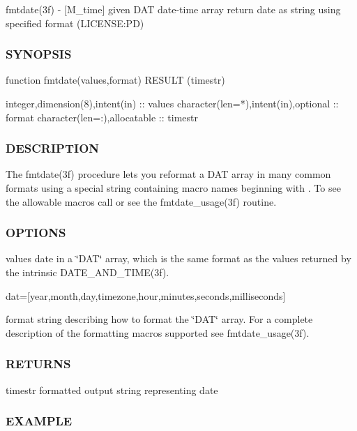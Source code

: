 fmtdate(3f) -\/ \mbox{[}M\+\_\+time\mbox{]} given D\+AT date-\/time array return date as string using specified format (L\+I\+C\+E\+N\+SE\+:PD) 

\subsubsection*{S\+Y\+N\+O\+P\+S\+IS}

\begin{DoxyVerb}function fmtdate(values,format) RESULT (timestr)

 integer,dimension(8),intent(in)      :: values
 character(len=*),intent(in),optional :: format
 character(len=:),allocatable         :: timestr
\end{DoxyVerb}


\subsubsection*{D\+E\+S\+C\+R\+I\+P\+T\+I\+ON}

The fmtdate(3f) procedure lets you reformat a D\+AT array in many common formats using a special string containing macro names beginning with \textquotesingle{}\textquotesingle{}. To see the allowable macros call or see the fmtdate\+\_\+usage(3f) routine.

\subsubsection*{O\+P\+T\+I\+O\+NS}

values date in a \char`\"{}\+D\+A\+T\char`\"{} array, which is the same format as the values returned by the intrinsic D\+A\+T\+E\+\_\+\+A\+N\+D\+\_\+\+T\+I\+M\+E(3f).

dat=\mbox{[}year,month,day,timezone,hour,minutes,seconds,milliseconds\mbox{]}

format string describing how to format the \char`\"{}\+D\+A\+T\char`\"{} array. For a complete description of the formatting macros supported see fmtdate\+\_\+usage(3f). \subsubsection*{R\+E\+T\+U\+R\+NS}

timestr formatted output string representing date

\subsubsection*{E\+X\+A\+M\+P\+LE}

